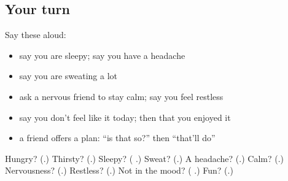 \subsection*{Your turn}
Say these aloud:

\begin{itemize}
\raggedright
  \item say you are sleepy; say you have a headache
  \item say you are sweating a lot
  \item ask a nervous friend to stay calm; say you feel restless
  \item say you don't feel like it today; then that you enjoyed it
  \item a friend offers a plan: \textquotedblleft{}is that so?\textquotedblright{} then \textquotedblleft{}that'll do\textquotedblright{}
\end{itemize}

\begin{tcolorbox}[breakable,colback=teal!4,colframe=teal!35!black,title={Before you move on}]
Hungry? (\textbf{}.) Thirsty? (\textbf{}.) Sleepy? (\textbf{   }.) Sweat? (\textbf{}.) A headache? (\textbf{}.) Calm? (\textbf{}.) Nervousness? (\textbf{}.) Restless? (\textbf{}.) Not in the mood? (\textbf{  }.) Fun? (\textbf{}.)
\end{tcolorbox}
